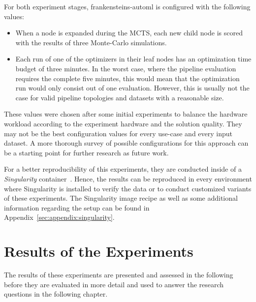 For both experiment stages, frankensteins-automl is configured with the following values:
\begin{itemize}
    \item When a node is expanded during the MCTS, each new child node is scored with the results of three Monte-Carlo simulations.
    \item Each run of one of the optimizers in their leaf nodes has an optimization time budget of three minutes. In the worst case, where the pipeline evaluation requires the complete five minutes, this would mean that the optimization run would only consist out of one evaluation. However, this is usually not the case for valid pipeline topologies and datasets with a reasonable size.
\end{itemize}
These values were chosen after some initial experiments to balance the hardware workload according to the experiment hardware and the solution quality.
They may not be the best configuration values for every use-case and every input dataset.
A more thorough survey of possible configurations for this approach can be a starting point for further research as future work.

For a better reproducibility of this experiments, they are conducted inside of a \textit{Singularity} container~\cite{Kurtzer-Singularity}.
Hence, the results can be reproduced in every environment where Singularity is installed to verify the data or to conduct customized variants of these experiments.
The Singularity image recipe as well as some additional information regarding the setup can be found in Appendix~\ref{sec:appendix:singularity}.

\section{Results of the Experiments}
\label{sec:evaluation:results}
The results of these experiments are presented and assessed in the following before they are evaluated in more detail and used to answer the research questions in the following chapter.

